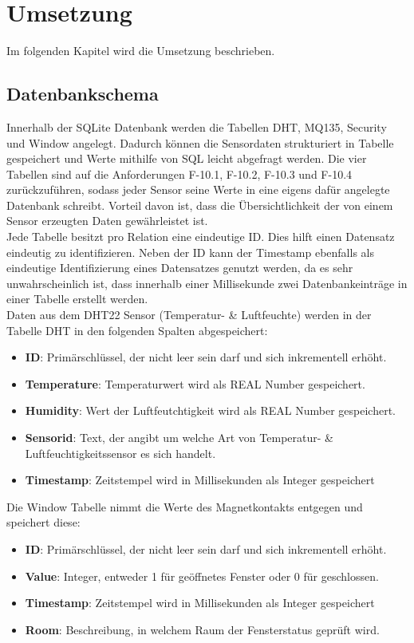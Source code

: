 \chapter{Umsetzung} \label{sec:Umsetzung}
Im folgenden Kapitel wird die Umsetzung beschrieben.

\section{Datenbankschema}\label{db:DB}
Innerhalb der SQLite Datenbank werden die Tabellen DHT, MQ135, Security und Window angelegt. Dadurch können die Sensordaten strukturiert in Tabelle gespeichert und Werte mithilfe von \acf{SQL} leicht abgefragt werden. Die vier Tabellen sind auf die Anforderungen F-10.1, F-10.2, F-10.3 und F-10.4 zurückzuführen, sodass jeder Sensor seine Werte in eine eigens dafür angelegte Datenbank schreibt. Vorteil davon ist, dass die Übersichtlichkeit der von einem Sensor erzeugten Daten gewährleistet ist.\\
Jede Tabelle besitzt pro Relation eine eindeutige ID. Dies hilft einen Datensatz eindeutig zu identifizieren. Neben der ID kann der Timestamp ebenfalls als eindeutige Identifizierung eines Datensatzes genutzt werden, da es sehr unwahrscheinlich ist, dass innerhalb einer Millisekunde zwei Datenbankeinträge in einer Tabelle erstellt werden.\\

Daten aus dem DHT22 Sensor (Temperatur- \& Luftfeuchte) werden in der Tabelle DHT in den folgenden Spalten abgespeichert:
\begin{itemize}
	\item \textbf{ID}: Primärschlüssel, der nicht leer sein darf und sich inkrementell erhöht.  
	\item \textbf{Temperature}: Temperaturwert wird als REAL Number gespeichert.
	\item \textbf{Humidity}: Wert der Luftfeutchtigkeit wird als REAL Number gespeichert.
	\item \textbf{Sensorid}: Text, der angibt um welche Art von Temperatur- \& Luftfeuchtigkeitssensor es sich handelt.
	\item \textbf{Timestamp}: Zeitstempel wird in Millisekunden als Integer gespeichert
\end{itemize}

Die Window Tabelle nimmt die Werte des Magnetkontakts entgegen und speichert diese:
\begin{itemize}
	\item \textbf{ID}: Primärschlüssel, der nicht leer sein darf und sich inkrementell erhöht.  
	\item \textbf{Value}: Integer, entweder 1 für geöffnetes Fenster oder 0 für geschlossen.
	\item \textbf{Timestamp}: Zeitstempel wird in Millisekunden als Integer gespeichert
	\item \textbf{Room}: Beschreibung, in welchem Raum der Fensterstatus geprüft wird. 
\end{itemize}

